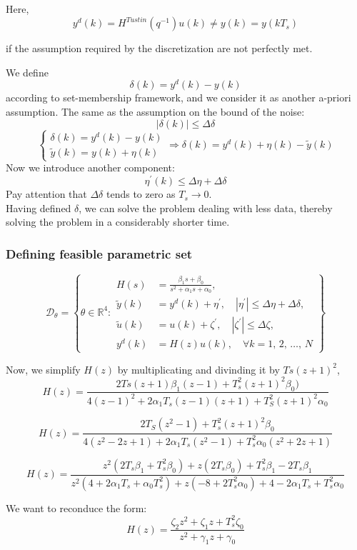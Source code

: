 Here, 
\[
y^d(k) = H^{Tustin}(q^{-1})u(k) \neq y(k) = y(k T_s)
\]

if the assumption required by the discretization are not perfectly met.

We define
\[
\delta(k) = y^d(k) - y(k)
\]
according to set-membership framework, and we consider it as another a-priori assumption. The same as the assumption on the bound of the noise:
\[
|\delta(k)|\leq \Delta\delta
\]
\[
\begin{cases}
\delta(k) = y^d(k)-y(k)\\
\tilde{y}(k) = y(k) + \eta(k)
\end{cases}
\Rightarrow
\delta(k) = y^d(k) + \eta(k) - \tilde{y}(k)
\]
Now we introduce another component:
\[
\eta^{'}(k) \leq \Delta \eta + \Delta \delta
\]
Pay attention that $\Delta \delta$ tends to zero as $T_s \to 0$.\\
Having defined $\delta$, we can solve the problem dealing with less data, thereby solving the problem in a considerably shorter time. 

\subsubsection{Defining feasible parametric set}
\[
\mathcal{D}_\theta = \left\{ \theta \in \mathbb{R}^4 : 
\begin{aligned}
H(s) &= \frac{\beta_1 s + \beta_0}{s^2 + \alpha_1 s + \alpha_0 }, \\
\tilde{y}(k) &= y^d(k) + \eta^{'} , \quad |\eta^{'}| \leq \Delta\eta + \Delta\delta, \\
\tilde{u}(k) &= u(k) + \zeta^{'} , \quad |\zeta^{'}| \leq \Delta\zeta , \\
y^d(k) &= H(z) u(k), \quad \forall k = 1,\, 2,\, \dots,\, N
\end{aligned}
\right\}
\]

Now, we simplify $H(z)$ by multiplicating and divinding it by $Ts (z+1)^2$,
\[
H(z) = \frac{2 Ts (z+1) \beta_1(z-1) + T_s^2 (z+1)^2\beta_0 )}{4(z-1)^2 + 2\alpha_1 T_s(z-1)(z+1) + T_S^2(z+1)^2\alpha_0}
\]

\[
H(z) = \frac{2 T_S (z^2-1) +T_s^2 (z+1)^2 \beta_0}{4(z^2-2z+1) + 2\alpha_1 T_s (z^2-1) + T_s^2 \alpha_0 (z^2 + 2z + 1)}
\]

\[
H(z) = \frac{z^2(2T_s \beta_1 + T_s^2\beta_0) + z(2 T_s \beta_0) + T_s^2 \beta_1 - 2 T_s \beta_1}{z^2(4 + 2 \alpha_1 T_s + \alpha_0 T_s^2) + z(-8 + 2 T_s^2 \alpha_0) + 4 - 2 \alpha_1 T_s + T_s^2 \alpha_0}
\]

We want to reconduce the form:
\[
H(z) = \frac{\zeta_2 z^2 + \zeta_1 z + T_s^2 \zeta_0}{z^2 + \gamma_1 z +  \gamma_0}
\]

